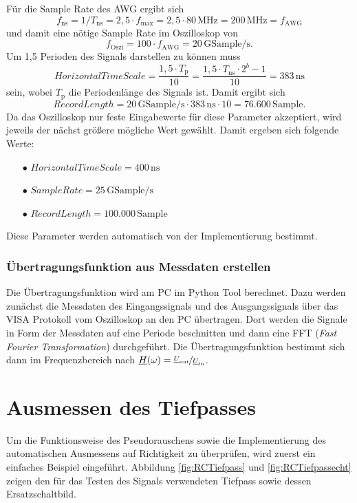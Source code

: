\documentclass[12pt,report,final,twoside,accentcolor=tud9b,bigchapter]{tudreport}
\begin{document}
Für die Sample Rate des AWG ergibt sich
\begin{equation}
f_\textrm{ns}=1/T_\textrm{ns}=2,5\cdot f_\textrm{max}=2,5 \cdot 80\, \mathrm{MHz}=200\,\mathrm{MHz}=f_\textrm{AWG}
\end{equation}
und damit eine nötige Sample Rate im Oszilloskop von
\begin{equation}
f_\textrm{Oszi}= 100 \cdot f_\textrm{AWG} = 20\,\mathrm{GSample/s}.
\end{equation}
Um 1,5 Perioden des Signals darstellen zu können muss
\begin{equation}
HorizontalTimeScale =\frac{1,5 \cdot T_{\mathrm{p}}}{10}= \frac{1,5 \cdot T_{\mathrm{ns}} \cdot 2^b-1}{10}=383\,\mathrm{ns}
\end{equation}
sein, wobei $T_{\mathrm{p}}$ die Periodenlänge des Signals ist.
Damit ergibt sich 
\begin{equation}
RecordLength = 20\,\mathrm{GSample/s} \cdot 383\,\mathrm{ns} \cdot 10 = 76.600\,\mathrm{Sample}.
\end{equation}
Da das Oszilloskop nur feste Eingabewerte für diese Parameter akzeptiert, wird jeweils der nächst größere mögliche Wert gewählt. Damit ergeben sich folgende Werte:
\begin{enumerate}
\item[$\bullet$] $HorizontalTimeScale = 400\,\mathrm{ns}$
\item[$\bullet$] $SampleRate = 25\,\mathrm{GSample/s}$
\item[$\bullet$] $RecordLength = 100.000\,\mathrm{Sample}$
\end{enumerate}
Diese Parameter werden automatisch von der Implementierung bestimmt.

\subsection{Übertragungsfunktion aus Messdaten erstellen}

Die Übertragungsfunktion wird am PC im Python Tool berechnet. Dazu werden zunächst die Messdaten des Eingangssignals und des Ausgangssignals über das VISA Protokoll vom Oszilloskop an den PC übertragen. Dort werden die Signale in Form der Messdaten auf eine Periode beschnitten und dann eine FFT (\textit{Fast Fourier Transformation}) durchgeführt. Die Übertragungsfunktion bestimmt sich dann im Frequenzbereich nach $\underline{H}(\omega)=\nicefrac{\underline{U}_{\mathrm{out}}}{\underline{U}_{\mathrm{in}}}$.

\chapter{Ausmessen des Tiefpasses}
Um die Funktionsweise des Pseudorauschens sowie die Implementierung des automatischen Ausmessens auf Richtigkeit zu überprüfen, wird zuerst ein einfaches Beispiel eingeführt. 
Abbildung \ref{fig:RCTiefpass} und \ref{fig:RCTiefpassecht} zeigen den für das Testen des Signals verwendeten Tiefpass sowie dessen Ersatzschaltbild.
\end{document}
